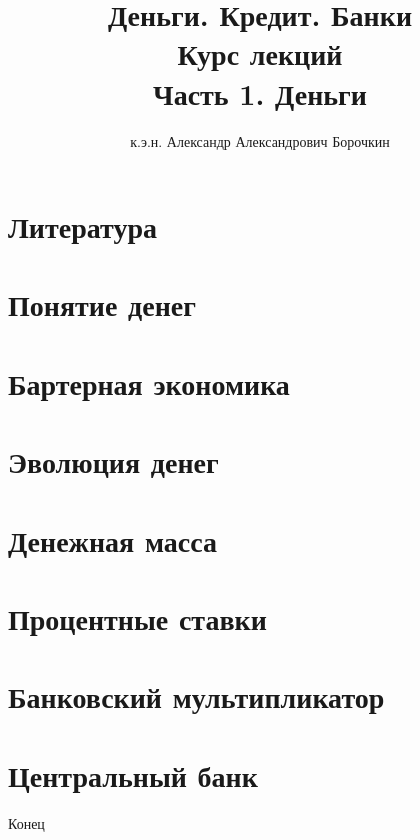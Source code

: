 \documentclass[12pt]{beamer}
\title[Деньги. Кредит. Банки.]{Деньги. Кредит. Банки\\Курс лекций\\Часть 1. Деньги}
\author{к.э.н. Александр Александрович Борочкин}
\institute{Нижегородский государственный университет}
\date{\the\year}
\begin{document}
\begin{frame}
\titlepage
\end{frame}

%
\section*{Литература}


\section{Понятие денег}


\section{Бартерная экономика}


\section{Эволюция денег}


\section{Денежная масса}


\section{Процентные ставки}


\section{Банковский мультипликатор}


\section{Центральный банк}


\begin{frame}
\begin{center}
\huge{Конец}
\end{center}
\end{frame}
\end{document}
